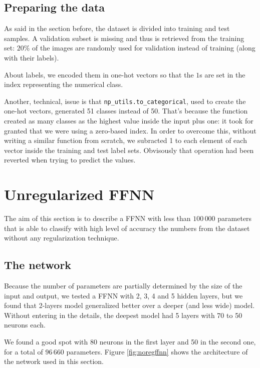 \documentclass[compsoc]{IEEEtran}
\begin{document}
\subsection{Preparing the data}
As said in the section before, the dataset is divided into training and test samples. A validation subset is missing and thus
is retrieved from the training set: $20\%$ of the images are randomly used for validation instead of training (along with their labels). \par
About labels, we encoded them in one-hot vectors so that the $1$s are set in the index representing the numerical class. \par

Another, technical, issue is that \texttt{np\_utils.to\_categorical}, used to create the one-hot vectors, generated 51 classes instead of 50. That's because the function created as many classes as the highest value inside the input plus one: it took for granted that we were using a zero-based index. In order
to overcome this, without writing a similar function from scratch, we subracted 1 to each element of each vector inside the training and test label sets.
Obvisously that operation had been reverted when trying to predict the values.


\section{Unregularized FFNN}\label{sec:noreg}

The aim of this section is to describe a FFNN with less than $100\,000$ parameters that is able to classify
with high level of accuracy the numbers from the dataset without any regularization technique. 

\subsection{The network}
Because the number of parameters
are partially determined by the size of the input and output, we tested a FFNN with 2, 3, 4 and 5 hidden layers, but we found that 2-layers model
generalized better over a deeper (and less wide) model. Without entering in the details, the deepest model had 5 layers with 70 to 50 neurons each.\par 


We found a good spot with 80 neurons in the first layer and 50 in the second one, for a total of $96\,660$ parameters. 
Figure \ref{fig:noregffnn} shows the architecture of the network used in this section.
\end{document}
